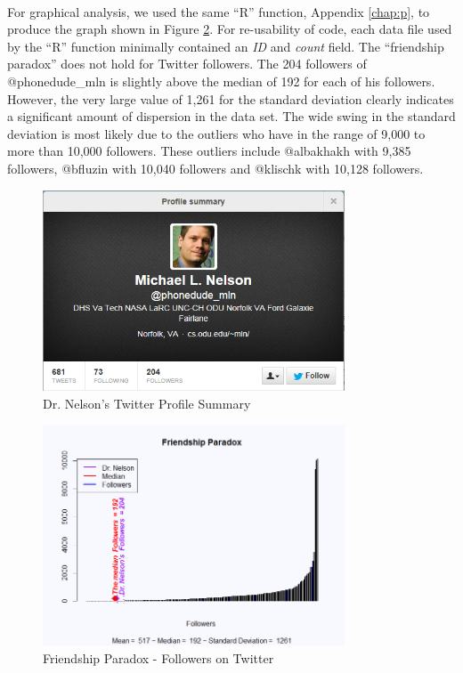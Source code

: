 \documentclass[letterpaper,11pt]{report}
\begin{document}
\begin{savenotes}
\paragraph{}For graphical analysis, we used the same ``R'' function, Appendix \ref{chap:p}, to produce the graph shown in Figure \ref{fig:followerParadox}. For re-usability of code, each data file used by the ``R'' function minimally contained an \emph{ID} and \emph{count} field.  The ``friendship paradox'' does not hold for Twitter followers. The 204 followers of @phonedude\_mln is slightly above the median of 192 for each of his followers. However, the very large value of 1,261 for the standard deviation clearly indicates a significant amount of dispersion in the data set. The wide swing in the standard deviation is most likely due to the outliers who have in the range of 9,000 to more than 10,000 followers. These outliers include @albakhakh with 9,385 followers, @bfluzin with 10,040 followers and @klischk with 10,128 followers.

\begin{figure}[htbp]
	\centering
		\includegraphics[width=0.80\textwidth]{phonedudeProfileSummary.png}
	\caption{Dr. Nelson's Twitter Profile Summary}
	\label{fig:phonedude}
\end{figure}

\begin{figure}[htbp]
	\centering
		\includegraphics[width=0.80\textwidth]{followersParadox.png}
	\caption{Friendship Paradox - Followers on Twitter}
	\label{fig:followerParadox}
\end{figure}


\end{savenotes}
\end{document}
